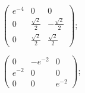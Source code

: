 \begin{enumsols}
		\item \( \begin{pmatrix} e^{-4} & 0 & 0 \\ 0 & \frac{\sqrt{2}}{2} & -\frac{\sqrt{2}}{2} \\ 0 & \frac{\sqrt{2}}{2} & \frac{\sqrt{2}}{2} \end{pmatrix} \); %
		\item \( \begin{pmatrix} 0 & -e^{-2} & 0 \\ e^{-2} & 0 & 0 \\ 0 & 0 & e^{-2} \end{pmatrix} \); %
		

\end{enumsols}
